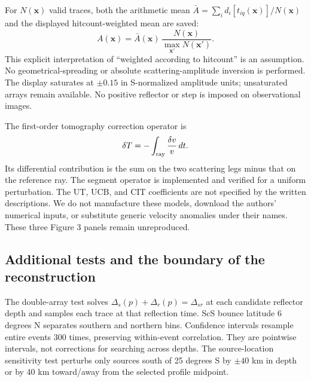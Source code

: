 For $N(\boldsymbol{x})$ valid traces, both the arithmetic mean
$\bar A=\sum_i d_i[t_{iq}(\boldsymbol{x})]/N(\boldsymbol{x})$ and the displayed
hitcount-weighted mean are saved:
\begin{equation}
 A(\boldsymbol{x})=\bar A(\boldsymbol{x})\,
 \frac{N(\boldsymbol{x})}{\max_{\boldsymbol{x}'}N(\boldsymbol{x}')}.
\end{equation}
This explicit interpretation of ``weighted according to hitcount'' is an
assumption. No geometrical-spreading or absolute scattering-amplitude inversion
is performed. The display saturates at $\pm0.15$ in S-normalized amplitude units;
unsaturated arrays remain available. No positive reflector or step is imposed
on observational images.

The first-order tomography correction operator is
\begin{equation} \delta T=-\int_{\rm ray}\frac{\delta v}{v}\,dt.\end{equation}
Its differential contribution is the sum on the two scattering legs minus
that on the reference ray. The segment operator is implemented and verified for
a uniform perturbation. The UT, UCB, and CIT coefficients are not specified by
the written descriptions. We do not manufacture these models, download the
authors' numerical inputs, or substitute generic velocity anomalies under their
names. These three Figure 3 panels remain unreproduced.

\subsection{Additional tests and the boundary of the reconstruction}
The double-array test solves $\Delta_s(p)+\Delta_r(p)=\Delta_{sr}$ at each
candidate reflector depth and samples each trace at that reflection time.
ScS bounce latitude 6 degrees N separates southern and northern bins. Confidence
intervals resample entire events 300 times, preserving within-event correlation.
They are pointwise intervals, not corrections for searching across depths.
The source-location sensitivity test perturbs only sources south of 25 degrees S
by $\pm40$ km in depth or by 40 km toward/away from the selected profile midpoint.

